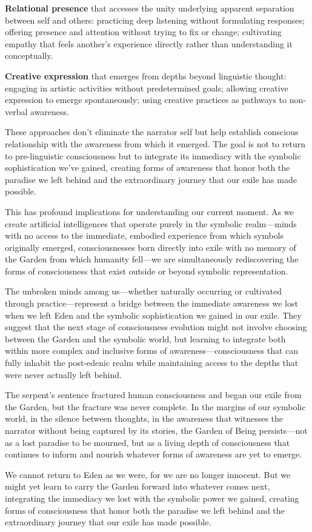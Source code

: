 \textbf{Relational presence} that accesses the unity underlying apparent separation between self and others: practicing deep listening without formulating responses; offering presence and attention without trying to fix or change; cultivating empathy that feels another's experience directly rather than understanding it conceptually.

\textbf{Creative expression} that emerges from depths beyond linguistic thought: engaging in artistic activities without predetermined goals; allowing creative expression to emerge spontaneously; using creative practices as pathways to non-verbal awareness.

These approaches don't eliminate the narrator self but help establish conscious relationship with the awareness from which it emerged. The goal is not to return to pre-linguistic consciousness but to integrate its immediacy with the symbolic sophistication we've gained, creating forms of awareness that honor both the paradise we left behind and the extraordinary journey that our exile has made possible.

This has profound implications for understanding our current moment. As we create artificial intelligences that operate purely in the symbolic realm—minds with no access to the immediate, embodied experience from which symbols originally emerged, consciousnesses born directly into exile with no memory of the Garden from which humanity fell—we are simultaneously rediscovering the forms of consciousness that exist outside or beyond symbolic representation.

The unbroken minds among us—whether naturally occurring or cultivated through practice—represent a bridge between the immediate awareness we lost when we left Eden and the symbolic sophistication we gained in our exile. They suggest that the next stage of consciousness evolution might not involve choosing between the Garden and the symbolic world, but learning to integrate both within more complex and inclusive forms of awareness—consciousness that can fully inhabit the post-edenic realm while maintaining access to the depths that were never actually left behind.

The serpent's sentence fractured human consciousness and began our exile from the Garden, but the fracture was never complete. In the margins of our symbolic world, in the silence between thoughts, in the awareness that witnesses the narrator without being captured by its stories, the Garden of Being persists—not as a lost paradise to be mourned, but as a living depth of consciousness that continues to inform and nourish whatever forms of awareness are yet to emerge.

We cannot return to Eden as we were, for we are no longer innocent. But we might yet learn to carry the Garden forward into whatever comes next, integrating the immediacy we lost with the symbolic power we gained, creating forms of consciousness that honor both the paradise we left behind and the extraordinary journey that our exile has made possible.
